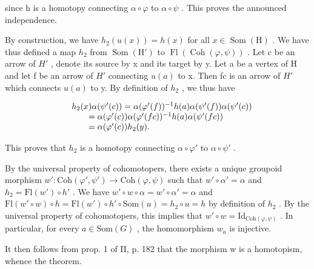 since h is a homotopy connecting \(\alpha \circ \varphi\) to \(\alpha \circ \psi\) . This proves the announced independence.

By construction, we have \(h_{2}(u(x)) = h(x)\) for all \(x \in \operatorname{Som}(\mathrm{H})\) . We have thus defined a map \(h_{2}\) from \(\operatorname{Som}(\mathrm{H}')\) to \(\operatorname{Fl}(\operatorname{Coh}(\varphi, \psi))\) . Let c be an arrow of \(H'\) , denote its source by x and its target by y. Let a be a vertex of H and let f be an arrow of \(H'\) connecting \(u(a)\) to x. Then fc is an arrow of \(H'\) which connects \(u(a)\) to y. By definition of \(h_{2}\) , we thus have

\[
\begin{array}{r l} & h _ {2} (x) \alpha (\psi^ {\prime} (c)) = \alpha (\varphi^ {\prime} (f)) ^ {- 1} h (a) \alpha (\psi^ {\prime} (f)) \alpha (\psi^ {\prime} (c)) \\ & \qquad = \alpha (\varphi^ {\prime} (c)) \alpha (\varphi^ {\prime} (f c)) ^ {- 1} h (a) \alpha (\psi^ {\prime} (f c)) \\ & \qquad = \alpha (\varphi^ {\prime} (c)) h _ {2} (y). \end{array}
\]

This proves that \(h_{2}\) is a homotopy connecting \(\alpha \circ \varphi'\) to \(\alpha \circ \psi'\) .

By the universal property of cohomotopers, there exists a unique groupoid morphism \(w'\colon \mathrm{Coh}(\varphi', \psi') \to \mathrm{Coh}(\varphi, \psi)\) such that \(w' \circ \alpha' = \alpha\) and \(h_2 = \mathrm{Fl}(w') \circ h'\) . We have \(w' \circ w \circ \alpha = w' \circ \alpha' = \alpha\) and \(\mathrm{Fl}(w' \circ w) \circ h = \mathrm{Fl}(w') \circ h' \circ \mathrm{Som}(u) = h_2 \circ u = h\) by definition of \(h_2\) . By the universal property of cohomotopers, this implies that \(w' \circ w = \mathrm{Id}_{\mathrm{Coh}(\varphi, \psi)}\) . In particular, for every \(a \in \mathrm{Som}(G)\) , the homomorphism \(w_a\) is injective.

It then follows from prop. 1 of II, p. 182 that the morphism w is a homotopism, whence the theorem.
